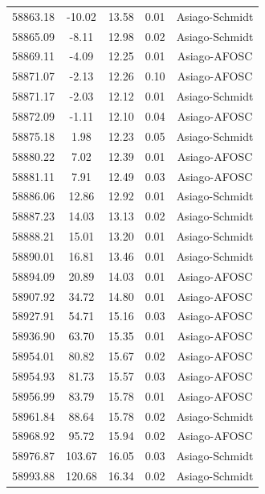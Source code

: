 \begin{longtable}{|c|c|c|c|c|}
 58863.18 &  -10.02 &       13.58 &          0.01 & Asiago-Schmidt \\
 58865.09 &   -8.11 &       12.98 &          0.02 & Asiago-Schmidt \\
 58869.11 &   -4.09 &       12.25 &          0.01 & Asiago-AFOSC  \\
 58871.07 &   -2.13 &       12.26 &          0.10 & Asiago-AFOSC  \\
 58871.17 &   -2.03 &       12.12 &          0.01 & Asiago-Schmidt \\
 58872.09 &   -1.11 &       12.10 &          0.04 & Asiago-AFOSC    \\
 58875.18 &    1.98 &       12.23 &          0.05 & Asiago-Schmidt \\
 58880.22 &    7.02 &       12.39 &          0.01 & Asiago-AFOSC  \\
 58881.11 &    7.91 &       12.49 &          0.03 & Asiago-AFOSC  \\
 58886.06 &   12.86 &       12.92 &          0.01 & Asiago-Schmidt \\
 58887.23 &   14.03 &       13.13 &          0.02 & Asiago-Schmidt \\
 58888.21 &   15.01 &       13.20 &          0.01 & Asiago-Schmidt \\
 58890.01 &   16.81 &       13.46 &          0.01 & Asiago-Schmidt \\
 58894.09 &   20.89 &       14.03 &          0.01 & Asiago-AFOSC  \\
 58907.92 &   34.72 &       14.80 &          0.01 & Asiago-AFOSC  \\
 58927.91 &   54.71 &       15.16 &          0.03 & Asiago-AFOSC  \\
 58936.90 &   63.70 &       15.35 &          0.01 & Asiago-AFOSC  \\
 58954.01 &   80.82 &       15.67 &          0.02 & Asiago-AFOSC  \\
 58954.93 &   81.73 &       15.57 &          0.03 & Asiago-AFOSC  \\
 58956.99 &   83.79 &       15.78 &          0.01 & Asiago-AFOSC  \\
 58961.84 &   88.64 &       15.78 &          0.02 & Asiago-Schmidt \\
 58968.92 &   95.72 &       15.94 &          0.02 & Asiago-AFOSC  \\
 58976.87 &  103.67 &       16.05 &          0.03 & Asiago-Schmidt \\
 58993.88 &  120.68 &       16.34 &          0.02 & Asiago-Schmidt \\

\end{longtable}
